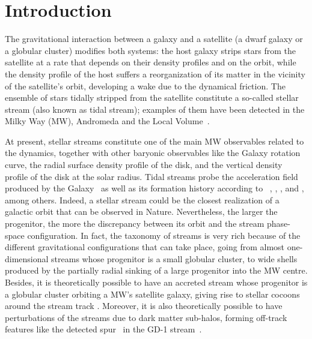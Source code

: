 \documentclass[twocolumn]{aa}
\begin{document}
\section{Introduction}
The gravitational interaction between a galaxy and a satellite (a dwarf galaxy or a globular cluster) modifies both systems: the host galaxy strips stars from the satellite at a rate
that depends on their density profiles and on the orbit,
while the density profile of the host suffers a reorganization of its matter in the vicinity of the satellite's orbit, developing a wake due to the dynamical friction.
The ensemble of stars tidally stripped from the satellite constitute a so-called stellar stream (also known as tidal stream); examples of them have been detected in the Milky Way (MW), Andromeda and the Local Volume~\citep{Martínez-Delgado_2010}.

At present, stellar streams constitute one of the main MW observables related to the dynamics, together with other baryonic observables like the Galaxy rotation curve, the radial surface density profile of the disk, and the vertical density profile of the disk at the solar radius.
Tidal streams probe the acceleration field produced by the Galaxy~\citep{1999ApJ...512L.109J,1999A&A...348L..49Z,2009ApJ...703L..67L,2013MNRAS.436.2386L,2016ASSL..420..169J,Ibata_2016,2017ApJ...842..120I,2017A&A...603A..65T,2021MNRAS.502.4170R} as well as its formation history according to ~\citet{1999Natur.402...53H}, \citet{2020ARA&A..58..205H}, \citet{2022A&A...666A..64R}, and \citet{2023arXiv230708730C}, among others.
Indeed, a stellar stream could be the closest realization of a galactic orbit that can be observed in Nature.
Nevertheless, the larger the progenitor, the more the discrepancy between its orbit and the stream phase-space configuration. In fact, the taxonomy of streams is very rich \citep{2015MNRAS.450..575A} because of the different gravitational configurations that can take place, going from almost one-dimensional streams whose progenitor is a small globular cluster, to wide shells produced by the partially radial sinking of a large progenitor into the MW centre. Besides, it is theoretically possible to have an accreted stream whose progenitor is a globular cluster orbiting a MW's satellite galaxy, giving rise to stellar cocoons around the
stream track \citep{2018ApJ...861...69C,2019ApJ...881..106M,2021MNRAS.501..179M,2021ApJ...911L..32G,2022MNRAS.511.2339Q}.
Moreover, it is also theoretically possible to have perturbations of the streams due to dark matter sub-halos, forming off-track features like the detected spur~\citep{Price-Whelan_2018} in
the GD-1 stream~\citep{Grillmair_2006}.
\end{document}
